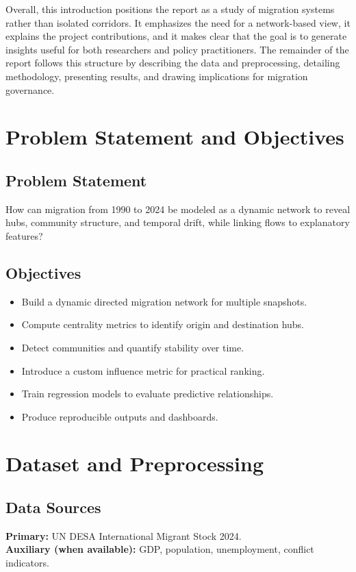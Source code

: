 \documentclass[12pt]{report}
\begin{document}
Overall, this introduction positions the report as a study of migration systems rather than isolated corridors. It emphasizes the need for a network-based view, it explains the project contributions, and it makes clear that the goal is to generate insights useful for both researchers and policy practitioners. The remainder of the report follows this structure by describing the data and preprocessing, detailing methodology, presenting results, and drawing implications for migration governance.

\chapter{Problem Statement and Objectives}
\section{Problem Statement}
How can migration from 1990 to 2024 be modeled as a dynamic network to reveal hubs, community structure, and temporal drift, while linking flows to explanatory features?

\section{Objectives}
\begin{itemize}
    \item Build a dynamic directed migration network for multiple snapshots.
    \item Compute centrality metrics to identify origin and destination hubs.
    \item Detect communities and quantify stability over time.
    \item Introduce a custom influence metric for practical ranking.
    \item Train regression models to evaluate predictive relationships.
    \item Produce reproducible outputs and dashboards.
\end{itemize}

\chapter{Dataset and Preprocessing}
\section{Data Sources}
\textbf{Primary:} UN DESA International Migrant Stock 2024.\\
\textbf{Auxiliary (when available):} GDP, population, unemployment, conflict indicators.
\end{document}
